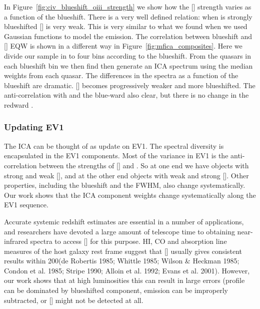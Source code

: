 In Figure~\ref{fig:civ_blueshift_oiii_strength} we show how the [] strength varies as a function of the  blueshift. 
There is a very well defined relation: when  is strongly blueshifted [] is very weak. 
This is very similar to what we found when we used Gaussian functions to model the emission. 
The correlation between  blueshift and [] EQW is shown in a different way in Figure~\ref{fig:mfica_composites}. 
Here we divide our sample in to four bins according to the  blueshift. 
From the quasars in each  blueshift bin we then find then generate an \ac{ICA} spectrum using the median weights from each quasar. 
The differences in the spectra as a function of the  blueshift are dramatic. 
[] becomes progressively weaker and more blueshifted.
The anti-correlation with  and the blue-ward  also clear, but there is no change in the redward . 

\subsubsection{Updating \ac{EV1}}

The \ac{ICA} can be thought of as update on \ac{EV1}. 
The spectral diversity is encapsulated in the \ac{EV1} components. 
Most of the variance in \ac{EV1} is the anti-correlation between the strengths of [] and . 
So at one end we have objects with strong  and weak [], and at the other end objects with weak  and strong []. 
Other properties, including the  blueshift and the \hb \ac{FWHM}, also change systematically. 
Our work shows that the \ac{ICA} component weights change systematically along the \ac{EV1} sequence. 


Accurate systemic redshift estimates are essential in a number of applications, and researchers have devoted a large amount of telescope time to obtaining near-infrared spectra to access [] for this purpose. 
HI, CO and absorption line measures of the host galaxy rest frame suggest that [] usually gives consistent results within 200\kms (de Robertis 1985; Whittle 1985; Wilson \& Heckman 1985; Condon et al. 1985; Stripe 1990; Alloin et al. 1992; Evans et al. 2001).  
However, our work shows that at high luminosities this can result in large errors (profile can be dominated by blueshifted component,  emission can be improperly subtracted, or [] might not be detected at all. 



